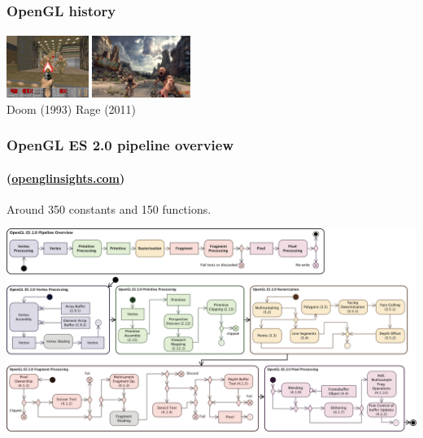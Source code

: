 \documentclass[10pt]{beamer}
\begin{document}
\begin{frame}
  \frametitle{OpenGL history}
  \framesubtitle{}
  
  \vfill
  \includegraphics[height=2cm]{doom.jpg}
  \hfill
  \includegraphics[height=2cm]{rage.jpg}\\
  \small Doom (1993) \hfill Rage (2011)
\end{frame}


\begin{frame}
  \frametitle{OpenGL ES 2.0 pipeline overview}
  \framesubtitle{(\url{openglinsights.com})}

  Around 350 constants and 150 functions.
  \begin{center}
    \includegraphics[width=1.0\textwidth]{GLES-Pipeline-2.png}
  \end{center}
\end{frame}
\end{document}
